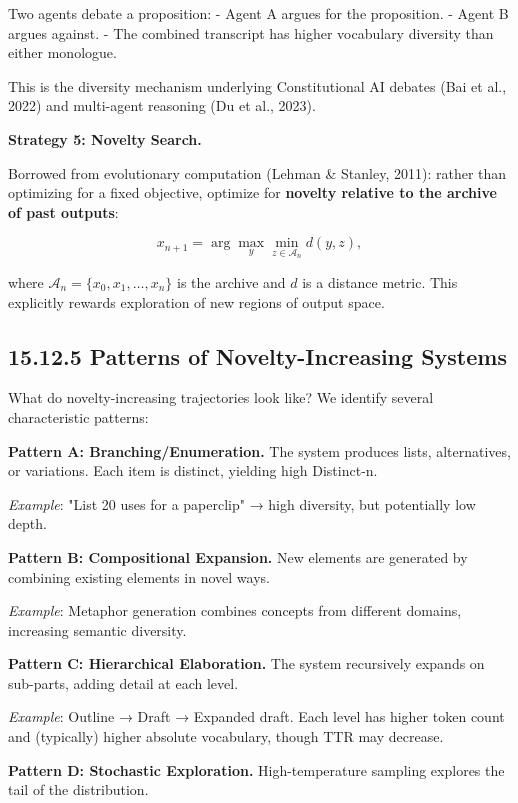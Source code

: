 \begin{example}
Two agents debate a proposition:
- Agent A argues for the proposition.
- Agent B argues against.
- The combined transcript has higher vocabulary diversity than either monologue.

This is the diversity mechanism underlying Constitutional AI debates (Bai et al., 2022) and multi-agent reasoning (Du et al., 2023).

\textbf{Strategy 5: Novelty Search.}

Borrowed from evolutionary computation (Lehman \& Stanley, 2011): rather than optimizing for a fixed objective, optimize for \textbf{novelty relative to the archive of past outputs}:

\[x_{n+1} = \arg\max_y \min_{z \in \mathcal{A}_n} d(y, z),\]

where $\mathcal{A}_n = \{x_0, x_1, \ldots, x_n\}$ is the archive and $d$ is a distance metric. This explicitly rewards exploration of new regions of output space.
\end{example}

\subsection{15.12.5 Patterns of Novelty-Increasing Systems}

What do novelty-increasing trajectories look like? We identify several characteristic patterns:

\textbf{Pattern A: Branching/Enumeration.}
The system produces lists, alternatives, or variations. Each item is distinct, yielding high Distinct-n.

\textit{Example}: "List 20 uses for a paperclip" → high diversity, but potentially low depth.

\textbf{Pattern B: Compositional Expansion.}
New elements are generated by combining existing elements in novel ways.

\textit{Example}: Metaphor generation combines concepts from different domains, increasing semantic diversity.

\textbf{Pattern C: Hierarchical Elaboration.}
The system recursively expands on sub-parts, adding detail at each level.

\textit{Example}: Outline → Draft → Expanded draft. Each level has higher token count and (typically) higher absolute vocabulary, though TTR may decrease.

\textbf{Pattern D: Stochastic Exploration.}
High-temperature sampling explores the tail of the distribution.

